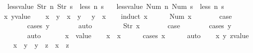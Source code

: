 \begin{isabellebody}
\ \ {\isachardoublequoteopen}less{\isacharunderscore}value\ {\isacharparenleft}Str\ n{\isacharparenright}\ {\isacharparenleft}Str\ s{\isacharparenright}\ {\isacharequal}\ less\ n\ s{\isachardoublequoteclose}\ {\isacharbar}\isanewline
\ \ {\isachardoublequoteopen}less{\isacharunderscore}value\ {\isacharparenleft}Num\ n{\isacharparenright}\ {\isacharparenleft}Num\ s{\isacharparenright}\ {\isacharequal}\ less\ n\ s{\isachardoublequoteclose}\isanewline
\isanewline
{}\isamarkupfalse%
%
\isadelimproof
\ %
\endisadelimproof
%
\isatagproof
{}\isamarkupfalse%
\isanewline
\ \ \isamarkupfalse%
\ x\ y{\isacharcolon}{\isacharcolon}{\isachardoublequoteopen}value{\isachardoublequoteclose}\isanewline
\ \ \isamarkupfalse%
\ {\isachardoublequoteopen}{\isacharparenleft}x\ {\isacharless}\ y{\isacharparenright}\ {\isacharequal}\ {\isacharparenleft}x\ {\isasymle}\ y\ {\isasymand}\ {\isasymnot}\ y\ {\isasymle}\ x{\isacharparenright}{\isachardoublequoteclose}\isanewline
\ \ \isamarkupfalse%
\ {\isacharparenleft}induct\ x{\isacharparenright}\isanewline
\ \ \ \ \isamarkupfalse%
\ {\isacharparenleft}Num\ x{\isacharparenright}\isanewline
\ \ \ \ \isamarkupfalse%
\ \isamarkupfalse%
\ {\isacharquery}case\isanewline
\ \ \ \ \ \ \isamarkupfalse%
\ {\isacharparenleft}cases\ y{\isacharparenright}\isanewline
\ \ \ \ \ \ \isamarkupfalse%
\ auto\isanewline
\ \ \isamarkupfalse%
\isanewline
\ \ \ \ \isamarkupfalse%
\ {\isacharparenleft}Str\ x{\isacharparenright}\isanewline
\ \ \ \ \isamarkupfalse%
\ \isamarkupfalse%
\ {\isacharquery}case\isanewline
\ \ \ \ \ \ \isamarkupfalse%
\ {\isacharparenleft}cases\ y{\isacharparenright}\isanewline
\ \ \ \ \ \ \isamarkupfalse%
\ auto\isanewline
\ \ \isamarkupfalse%
\isanewline
\ \ \isamarkupfalse%
\ x\ {\isacharcolon}{\isacharcolon}\ {\isachardoublequoteopen}value{\isachardoublequoteclose}\isanewline
\ \ \isamarkupfalse%
\ {\isachardoublequoteopen}x\ {\isasymle}\ x{\isachardoublequoteclose}\isanewline
\ \ \ \ \isamarkupfalse%
\ {\isacharparenleft}cases\ x{\isacharparenright}\isanewline
\ \ \ \ \isamarkupfalse%
\ auto\isanewline
\ \ \isamarkupfalse%
\ x\ y\ z{\isacharcolon}{\isacharcolon}{\isachardoublequoteopen}value{\isachardoublequoteclose}\isanewline
\ \ \isamarkupfalse%
\ {\isachardoublequoteopen}x\ {\isasymle}\ y\ {\isasymLongrightarrow}\ y\ {\isasymle}\ z\ {\isasymLongrightarrow}\ x\ {\isasymle}\ z{\isachardoublequoteclose}\isanewline

\end{isabellebody}
